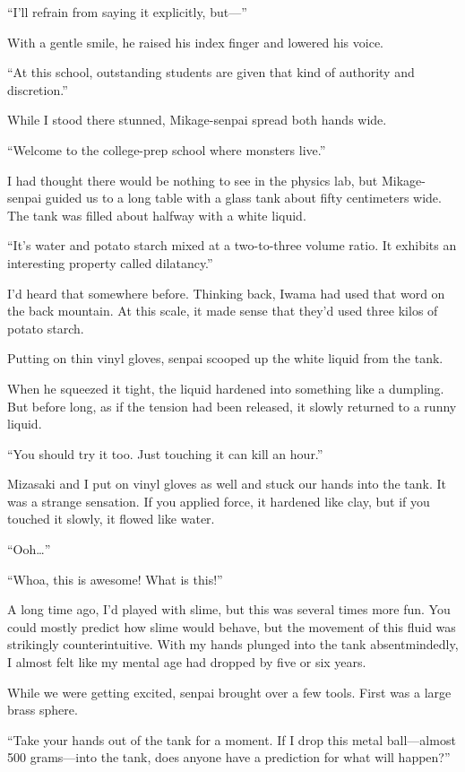\documentclass[
    a4paper,
    12pt,
    twoside,
    openany,
    UTF8,
    fontset=windows
]{ctexbook}
\begin{document}
``I'll refrain from saying it explicitly, but---''

With a gentle smile, he raised his index finger and lowered his voice.

``At this school, outstanding students are given that kind of authority and discretion.''

While I stood there stunned, Mikage-senpai spread both hands wide.

``Welcome to the college-prep school where monsters live.''

I had thought there would be nothing to see in the physics lab, but Mikage-senpai guided us to a long table with a glass tank about fifty centimeters wide. The tank was filled about halfway with a white liquid.

``It's water and potato starch mixed at a two-to-three volume ratio. It exhibits an interesting property called dilatancy.''

I'd heard that somewhere before. Thinking back, Iwama had used that word on the back mountain. At this scale, it made sense that they'd used three kilos of potato starch.

Putting on thin vinyl gloves, senpai scooped up the white liquid from the tank.

When he squeezed it tight, the liquid hardened into something like a dumpling. But before long, as if the tension had been released, it slowly returned to a runny liquid.

``You should try it too. Just touching it can kill an hour.''

Mizasaki and I put on vinyl gloves as well and stuck our hands into the tank. It was a strange sensation. If you applied force, it hardened like clay, but if you touched it slowly, it flowed like water.

``Ooh\dots''

``Whoa, this is awesome! What is this!''

A long time ago, I'd played with slime, but this was several times more fun. You could mostly predict how slime would behave, but the movement of this fluid was strikingly counterintuitive. With my hands plunged into the tank absentmindedly, I almost felt like my mental age had dropped by five or six years.

While we were getting excited, senpai brought over a few tools. First was a large brass sphere.

``Take your hands out of the tank for a moment. If I drop this metal ball---almost 500 grams---into the tank, does anyone have a prediction for what will happen?''
\end{document}
